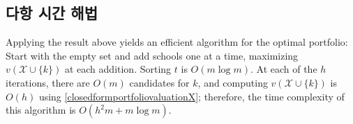 \documentclass[12pt]{article} %
\DeclareMathOperator*{\argmax}{arg\,max}
\newif\ifen
\newtheorem{theorem}{Theorem}
\theoremstyle{definition}
\newtheorem{theorem}{정리}
\theoremstyle{definition}
\begin{document}
\ifen \subsection{Polynomial-time solution} \else \subsection{다항 시간 해법}\fi
Applying the result above yields an efficient algorithm for the optimal portfolio: Start with the empty set and add schools one at a time, maximizing $v(\mathcal{X}\cup \{k\})$ at each addition. Sorting $t$ is  $O(m \log m)$.  At each of the $h$ iterations, there are $O(m)$ candidates for $k$, and computing $v(\mathcal{X}\cup \{k\})$ is $O(h)$ using \eqref{closedformportfoliovaluationX}; therefore, the time complexity of this algorithm is $O(h^2 m + m \log m)$. 
%
\end{document}
